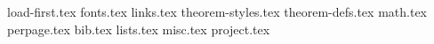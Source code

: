 
{load-first.tex}
{fonts.tex}
{links.tex}
{theorem-styles.tex}
{theorem-defs.tex}
{math.tex}
{perpage.tex}
{bib.tex}
{lists.tex}
{misc.tex}
{project.tex}
